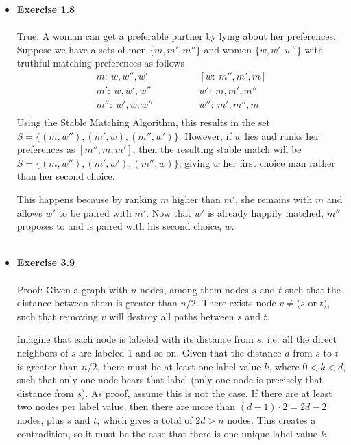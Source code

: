\documentclass[a4paper]{article}
\begin{document}
\begin{itemize}
\item{\textbf{Exercise 1.8}} \\
\\
True. A woman can get a preferable partner by lying about her preferences. Suppose we have a sets of men $\{m, m', m''\}$ and women $\{w, w', w''\}$ with truthful matching preferences as follows
\begin{align*}
m: \: w, w'', w' \hspace{48pt}& [w: \: m'', m',m] \\
m': \: w, w',w'' \hspace{48pt}& w': \: m, m',m'' \\
m'': \: w', w, w'' \hspace{48pt}& w'': \: m', m'',m \\
\end{align*}
Using the Stable Matching Algorithm, this results in the set $S= \{(m, w''), (m', w), (m'',w')\}$. However, if $w$ lies and ranks her preferences as $[m'',m,m']$, then the resulting stable match will be $S= \{(m, w''), (m', w'), (m'',w)\}$, giving $w$ her first choice man rather than her second choice. 

This happens because by ranking $m$ higher than $m'$, she remains with $m$ and allows $w'$ to be paired with $m'$. Now that $w'$ is already happily matched, $m''$ proposes to and is paired with his second choice, $w$.
\\
\\

\item{\textbf{Exercise 3.9}} \\
\\
Proof: Given a graph with $n$ nodes, among them nodes $s$ and $t$ such that the distance between them is greater than $n/2$. There exists node $v \neq (s$ or $t)$, such that removing $v$ will destroy all paths between $s$ and $t$.  

Imagine that each node is labeled with its distance from $s$, i.e. all the direct neighbors of $s$ are labeled 1 and so on. Given that the distance $d$ from $s$ to $t$ is greater than $n/2$, there must be at least one label value $k$, where $0 < k < d$, such that only one node bears that label (only one node is precisely that distance from $s$). As proof, assume this is not the case. If there are at least two nodes per label value, then there are more than $(d-1) \cdot 2 = 2d-2$ nodes, plus $s$ and $t$, which gives a total of $2d > n$ nodes. This creates a contradition, so it must be the case that there is one unique label value $k$.


\end{itemize}
\end{document}
